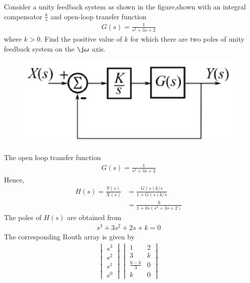 \item Consider a unity feedback system as shown in the figure,shown with an integral compensator $\frac{k}{s}$ and open-loop transfer function
\begin{align}
 G(s) = \frac{1}{s^2+3s+2}
\end{align}   
   where $k>0$. Find the positive value of $k$ for which there are two poles of unity feedback system on the $\j\omega$ axis.
 \begin{figure}[!ht]
\centering
     \includegraphics[width=\columnwidth]{./figs/ee18btech11001/ee18btech11001.eps}
\caption{}
\label{fig:routh}
    \end{figure}

\solution  The open loop transfer function
%
\begin{align}
G(s) = \frac{1}{s^2+3s+2}
\end{align}
%
Hence,
\begin{align}
H(s) = \frac{Y(s)}{X(s)} &= \frac{G(s)k/s}{1+G(s)k/s}
\\
&=  \frac{k}{1 + ks(s^2+3s+2)}
\end{align}
%
The poles of $H(s)$ are obtained from 
\begin{align}
s^3+3s^2+2s+k = 0
\end{align}
%
The corresponding Routh array is given by 
\begin{align}
\begin{vmatrix}
s^3\\s^2\\s^1 \\ s^0 
\end{vmatrix} 
\begin{vmatrix}
1 & 2 \\ 3 & k \\  \frac{6-k}{3} & 0\\ k & 0
\end{vmatrix}
\end{align}


